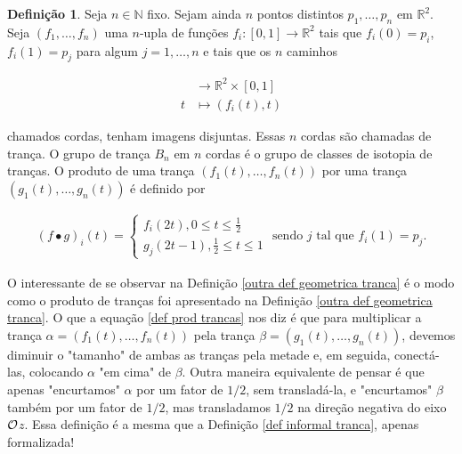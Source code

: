 \documentclass[a4paper,portuguese,11pt,twoside, leqno]{book}
\theoremstyle{definition}
\newtheorem{deff}{Definição}[section]
\begin{document}
	\begin{deff}
		\label{outra def geometrica tranca}
		Seja $n\in\mathbb{N}$ fixo. Sejam ainda $n$ pontos distintos $p_1, \dots, p_n$ em $\mathbb{R}^2$. Seja $(f_1, \dots, f_n)$ uma $n$-upla de funções $f_i:[0,1]\to\mathbb{R}^2$ tais que $f_i(0) = p_i$, $f_i(1) = p_j$ para algum $j=1,\dots,n$ e tais que os $n$ caminhos 
		
		\begin{align*}
		[0,1]&\to\mathbb{R}^2\times[0,1] \\
		t&\mapsto (f_i(t), t)
		\end{align*}
		
		\par\vspace{0.3cm} chamados cordas, tenham imagens disjuntas. Essas $n$ cordas são chamadas de trança. O grupo de trança $B_n$ em $n$ cordas é o grupo de classes de isotopia de tranças. O produto de uma trança $( f_1(t), \dots, f_n(t) )$ por uma trança $( g_1(t), \dots, g_n(t) )$ é definido por
		
		\begin{align}
		\label{def prod trancas}
		(f\bullet g)_i(t) = \begin{cases}
		f_i(2t), 0\leq t\leq \displaystyle{\frac{1}{2}} \\
		g_j(2t-1), \displaystyle{\frac{1}{2}}\leq t\leq 1
		\end{cases}\text{ sendo } j \text{ tal que }f_i(1) = p_j.
		\end{align}
		
	\end{deff}
	
	\par\vspace{0.3cm} O interessante de se observar na Definição \eqref{outra def geometrica tranca} é o modo como o produto de tranças foi apresentado na Definição \eqref{outra def geometrica tranca}. O que a equação \eqref{def prod trancas} nos diz é que para multiplicar a trança $\alpha = ( f_1(t), \dots, f_n(t) )$ pela trança $\beta = ( g_1(t), \dots, g_n(t) )$, devemos diminuir o "tamanho" de ambas as tranças pela metade e, em seguida, conectá-las, colocando $\alpha$ "em cima" de $\beta$. Outra maneira equivalente de pensar é que apenas "encurtamos" $\alpha$ por um fator de $1/2$, sem transladá-la, e "encurtamos" $\beta$ também por um fator de $1/2$, mas transladamos $1/2$ na direção negativa do eixo $\cal{O}$$z$. Essa definição é a mesma que a Definição \eqref{def informal tranca}, apenas formalizada!
	
\end{document}
